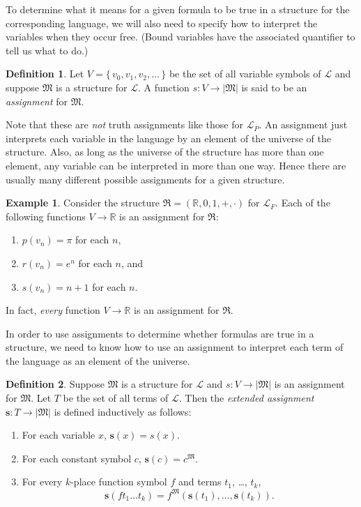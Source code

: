 \documentclass[12pt]{amsbook}
\theoremstyle{plain}
\theoremstyle{definition}
\newtheorem{defn}{Definition}[chapter]
\newtheorem{exmp}{Example}[chapter]
\theoremstyle{remark}
\begin{document}
To determine what it means for a given formula to be true in a structure for the corresponding language,  we will also need to specify how to interpret the variables when they occur free.  (Bound variables have the associated quantifier to tell us what to do.)  

\begin{defn} \label{d:ass} 
Let $V = \{\, v_0, v_1, v_2, \dots \,\}$ be the set of all variable symbols of $\mathcal{L}$ and suppose $\mathfrak{M}$ is a structure for $\mathcal{L}$.  A function $s : V \to |\mathfrak{M}|$ is said to be an {\em assignment\/} for $\mathfrak{M}$.
\end{defn}

Note that these are {\em not\/} truth assignments like those for $\mathcal{L}_P$.  An assignment just interprets each variable in the language by an element of the universe of the structure.  Also,  as long as the universe of the structure has more than one element,  any variable can be interpreted in more than one way.  Hence there are usually many different possible assignments for a given structure.

\begin{exmp} \label{e:as}
Consider the structure $\mathfrak{R} = (\mathbb{R},0,1,+,\cdot)$ for $\mathcal{L}_F$.  Each of the following functions $V \to \mathbb{R}$ is an assignment for $\mathfrak{R}$:
\begin{enumerate}
\item $p(v_n) = \pi$ for each $n$,
\item $r(v_n) = e^n$ for each $n$,  and
\item $s(v_n) = n + 1$ for each $n$.
\end{enumerate}
In fact,  {\em every\/} function $V \to \mathbb{R}$ is an assignment for $\mathfrak{R}$.
\end{exmp}

In order to use assignments to determine whether formulas are true in a structure,  we need to know how to use an assignment to interpret each term of the language as an element of the universe.

\begin{defn} \label{d:exas} 
Suppose $\mathfrak{M}$ is a structure for $\mathcal{L}$ and $s \colon V \to |\mathfrak{M}|$ is an assignment for $\mathfrak{M}$.  Let $T$ be the set of all terms of $\mathcal{L}$.  Then the {\em extended assignment\/} $\mathbf{s} \colon T \to |\mathfrak{M}|$ is defined inductively as follows:
\begin{enumerate}
\item For each variable $x$,  $\mathbf{s}(x) = s(x)$.
\item For each constant symbol $c$,  $\mathbf{s}(c) = c^{\mathfrak{M}}$.
\item For every $k$-place function symbol $f$ and terms $t_1$, \dots, $t_k$,  
\[ \mathbf{s}(f t_1 \dots t_k) = f^{\mathfrak{M}} (\mathbf{s}(t_1), \dots, \mathbf{s}(t_k) ). \]
\end{enumerate}
\end{defn}
\end{document}
